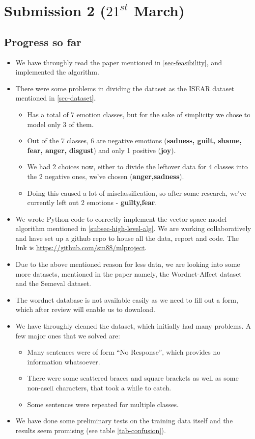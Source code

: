 \chapter{Submission 2 ($21^{st}$ March)}
\section{Progress so far}
\label{sec-prog-so-far}
\begin{itemize}
 \item We have throughly read the paper mentioned in \ref{sec-feasibility}, and implemented the algorithm.
 \item There were some problems in dividing the dataset as the ISEAR dataset mentioned in \ref{sec-dataset}.
 \begin{itemize}
  \item Has a total of 7 emotion classes, but for the sake of simplicity we chose to model only 3 of them.
  \item Out of the 7 classes, 6 are negative emotions (\textbf{sadness, guilt, shame, fear, anger, disgust}) and only 1 positive (\textbf{joy}).
  \item We had 2 choices now, either to divide the leftover data for 4 classes into the 2 negative ones, we've chosen (\textbf{anger,sadness}).
  \item Doing this caused a lot of misclassification, so after some research, we've currently left out 2 emotions - \textbf{guilty,fear}.
 \end{itemize}
 \item We wrote Python code to correctly implement the vector space model algorithm mentioned in \ref{subsec-high-level-alg}. We are working collaboratively and have set up a github repo to house all the data, report and code. The link is \url{https://github.com/sm88/mlproject}.
 \item Due to the above mentioned reason for less data, we are looking into some more datasets, mentioned in the paper namely, the Wordnet-Affect dataset and the Semeval dataset.
 \item The wordnet database is not available easily as we need to fill out a form, which after review will enable us to download.
 \item We have throughly cleaned the dataset, which initially had many problems. A few major ones that we solved are:
 \begin{itemize}
  \item Many sentences were of form ``No Response'', which provides no information whatsoever.
  \item There were some scattered braces and square brackets as well as some non-ascii characters, that took a while to catch.
  \item Some sentences were repeated for multiple classes.
 \end{itemize}
 \item We have done some preliminary tests on the training data itself and the results seem promising (see table \ref{tab-confusion}).
\end{itemize}
